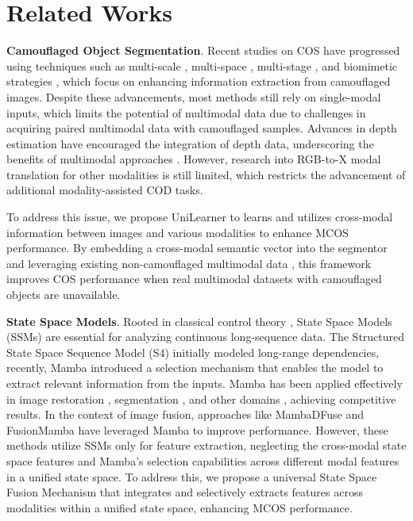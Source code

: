 \section{Related Works}
\noindent \textbf{Camouflaged Object Segmentation}. Recent studies on COS have progressed using techniques such as multi-scale \cite{pang2024zoomnext}, multi-space \cite{zhong2022detecting, sun2025frequency}, multi-stage \cite{jia2022segment}, and biomimetic strategies \cite{he2023strategic}, which focus on enhancing information extraction from camouflaged images. Despite these advancements, most methods still rely on single-modal inputs, which limits the potential of multimodal data due to challenges in acquiring paired multimodal data with camouflaged samples. Advances in depth estimation have encouraged the integration of depth data, underscoring the benefits of multimodal approaches \cite{xiang2022exploringdepthcontributioncamouflaged, wu2023source, yu2024exploring, wang2024depth, wang2023depth}. However, research into RGB-to-X modal translation for other modalities is still limited, which restricts the advancement of additional modality-assisted COD tasks.

To address this issue, we propose UniLearner to learns and utilizes cross-modal information between images and various modalities to enhance MCOS performance. By embedding a cross-modal semantic vector into the segmentor and leveraging existing non-camouflaged multimodal data%
, this framework improves COS performance when real multimodal datasets with camouflaged objects are unavailable.

\noindent \textbf{State Space Models}. Rooted in classical control theory \cite{10.1115/1.3662552}, State Space Models (SSMs) are essential for analyzing continuous long-sequence data. The Structured State Space Sequence Model (S4) \cite{gu2022efficientlymodelinglongsequences} initially modeled long-range dependencies, recently, Mamba \cite{gu2024mambalineartimesequencemodeling, xiao2025mambatree} introduced a selection mechanism  that enables the model to extract relevant information from the inputs. Mamba has been applied effectively in image restoration \cite{guo2024mambairsimplebaselineimage, li2024fouriermambafourierlearningintegration, yang2024learning, zheng2024fd, zheng2024u}, segmentation \cite{wang2024mamba, xing2024segmamba}, and other domains \cite{zhang2024motion, zubic2024state}, achieving competitive results. 
In the context of image fusion, approaches like MambaDFuse \cite{li2024mambadfusemambabaseddualphasemodel} and FusionMamba \cite{xie2024fusionmambadynamicfeatureenhancement} have leveraged Mamba to improve performance. However, these methods utilize SSMs only for feature extraction, neglecting the cross-modal state space features and Mamba’s selection capabilities across different modal features in a unified state space.
To address this, we propose a universal State Space Fusion Mechanism that integrates and selectively extracts features across modalities within a unified state space, enhancing MCOS performance.

